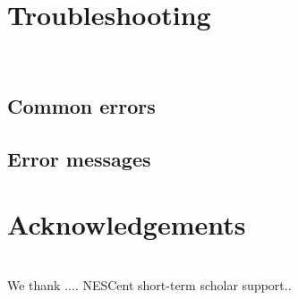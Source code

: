 \documentclass[12pt,letterpaper]{article}
\begin{document}
\bigskip\section{Troubleshooting}\\
\subsection{Common errors}
\subsection{Error messages}


\bigskip\section{Acknowledgements}\\
We thank .... NESCent short-term scholar support.. 

%
%
%
%
%
%
%





\end{document}
